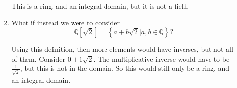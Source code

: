 \documentclass[10pt]{amsart}
\begin{document}
\begin{enumerate}
\begin{enumerate}[listparindent=0.7cm]
        This is a ring, and an integral domain, but it is not a field.
      \item What if instead we were to consider
        \[\mathbb{Q}\left[\sqrt{2}\right]=\left\{a+b\sqrt{2}|a,b\in\mathbb{Q}\right\}?\]

        Using this definition, then more elements would have inverses, but not
        all of them. Consider $0+1\sqrt{2}$. The multiplicative inverse would
        have to be $\frac{1}{\sqrt{2}}$, but this is not in the domain. So this
        would still only be a ring, and an integral domain.
    \end{enumerate}
\end{enumerate}
\end{document}
